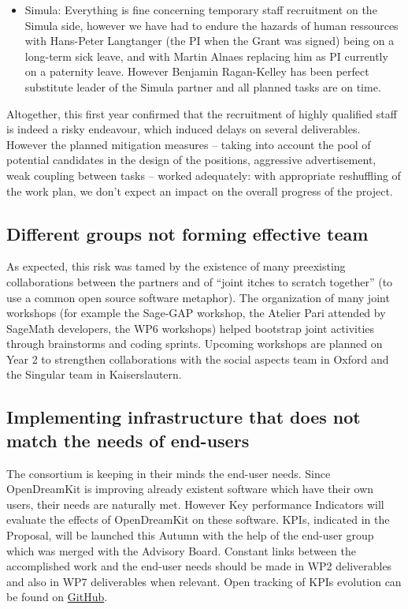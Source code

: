\documentclass{deliverablereport}
\begin{document}
\begin{itemize}
\item{Simula:} Everything is fine concerning temporary staff recruitment on the Simula side, however we have had to endure the hazards of human ressources with Hans-Peter Langtanger (the PI when the Grant was signed) being on a long-term sick leave, and with Martin Alnaes replacing him as PI currently on a paternity leave. However Benjamin Ragan-Kelley has been perfect  substitute leader of the Simula partner and all planned tasks are on time.\\
\end{itemize}


Altogether, this first year confirmed that the recruitment of highly
qualified staff is indeed a risky endeavour, which induced delays on
several deliverables. However the planned mitigation measures --
taking into account the pool of potential candidates in the design of
the positions, aggressive advertisement, weak coupling between tasks
-- worked adequately: with appropriate reshuffling of the work plan,
we don't expect an impact on the overall progress of the project.

\subsection{Different groups not forming effective team}

As expected, this risk was tamed by the existence of many preexisting
collaborations between the partners and of ``joint itches to scratch
together'' (to use a common open source software metaphor). The
organization of many joint workshops (for example the Sage-GAP
workshop, the Atelier Pari attended by SageMath developers, the WP6
workshops) helped bootstrap joint activities through brainstorms and
coding sprints. Upcoming workshops are planned on Year 2 to strengthen
collaborations with the social aspects team in Oxford and the Singular
team in Kaiserslautern.


\subsection{Implementing infrastructure that does not match the needs of end-users}

The consortium is keeping in their minds the end-user needs. Since OpenDreamKit is improving already existent software which have their own users, their needs are naturally met. However Key performance Indicators will evaluate the effects of OpenDreamKit on these software. KPIs, indicated in the Proposal, will be launched this Autumn with the help of the end-user group which was merged with the Advisory Board. Constant links between the accomplished work and the end-user needs should be made in WP2 deliverables and also in WP7 deliverables when relevant.
Open tracking of KPIs evolution can be found on \href{https://github.com/OpenDreamKit/OpenDreamKit/labels/KPI}{GitHub}.
\end{document}
